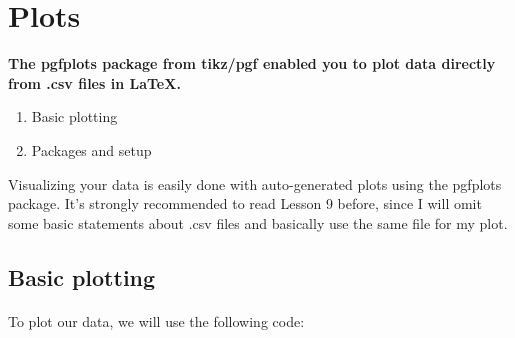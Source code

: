 
\maketitle
\newpage
\section{Plots}
  \textbf{
    The pgfplots package from tikz/pgf enabled you to plot data directly from .csv files in LaTeX.
  }
  \begin{enumerate} %
    \item Basic plotting
    \item Packages and setup
  \end{enumerate} 
  Visualizing your data is easily done with auto-generated plots using the pgfplots package. It's strongly recommended to read Lesson 9 before, since I will omit some basic statements about .csv files and basically use the same file for my plot.

  \subsection{Basic plotting}
  \paragraph{}
  To plot our data, we will use the following code:

